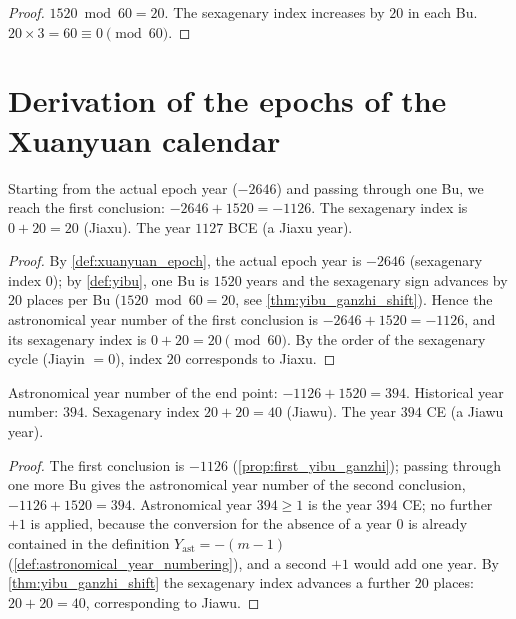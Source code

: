 \begin{proof}
\(1520\bmod 60=20\). The sexagenary index increases by \(20\) in each Bu. \(20\times 3=60\equiv 0\pmod{60}\).
\end{proof}

\section{Derivation of the epochs of the Xuanyuan calendar}
\label{sec:xuanyuan_epoch}

\begin{proposition}\label{prop:first_yibu_ganzhi}
Starting from the actual epoch year (\(-2646\)) and passing through one Bu, we reach the first conclusion: \(-2646+1520=-1126\). The sexagenary index is \(0+20=20\) (Jiaxu). The year \(1127\) BCE (a Jiaxu year).
\end{proposition}

\begin{proof}
By \cref{def:xuanyuan_epoch}, the actual epoch year is \(-2646\) (sexagenary index \(0\)); by \cref{def:yibu}, one Bu is \(1520\) years and the sexagenary sign advances by \(20\) places per Bu (\(1520\bmod 60=20\), see \cref{thm:yibu_ganzhi_shift}). Hence the astronomical year number of the first conclusion is \(-2646+1520=-1126\), and its sexagenary index is \(0+20=20\pmod{60}\). By the order of the sexagenary cycle (Jiayin \(=0\)), index \(20\) corresponds to Jiaxu.
\end{proof}

\begin{proposition}\label{prop:second_yibu_correction}
Astronomical year number of the end point: \(-1126+1520=394\). Historical year number: \(394\). Sexagenary index \(20+20=40\) (Jiawu). The year \(394\) CE (a Jiawu year).
\end{proposition}

\begin{proof}
The first conclusion is \(-1126\) (\cref{prop:first_yibu_ganzhi}); passing through one more Bu gives the astronomical year number of the second conclusion, \(-1126+1520=394\). Astronomical year \(394\ge 1\) is the year \(394\) CE; no further \(+1\) is applied, because the conversion for the absence of a year \(0\) is already contained in the definition \(Y_{\text{ast}}=-(m-1)\) (\cref{def:astronomical_year_numbering}), and a second \(+1\) would add one year. By \cref{thm:yibu_ganzhi_shift} the sexagenary index advances a further \(20\) places: \(20+20=40\), corresponding to Jiawu.
\end{proof}

